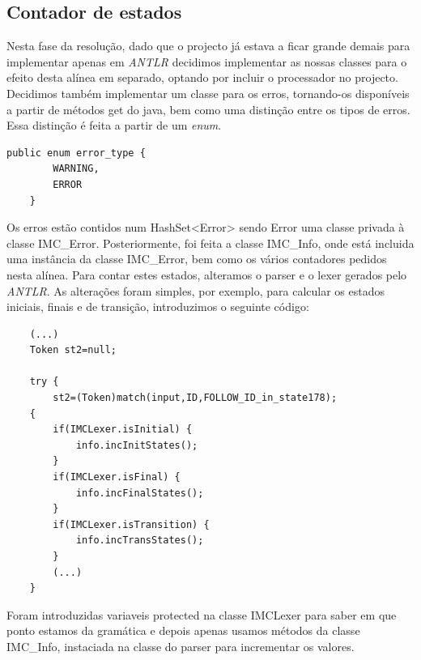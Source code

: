 \documentclass[a4paper,11pt,openright,openbib]{article}
\begin{document}
\subsection{Contador de estados} %
\label{sub:contador_de_estados}
Nesta fase da resolução, dado que o projecto já estava a ficar grande demais para implementar apenas em \emph{ANTLR} decidimos implementar as nossas classes para o efeito desta alínea em separado, optando por incluir o processador no projecto. Decidimos também implementar um classe para os erros, tornando-os disponíveis a partir de métodos get do java, bem como uma distinção entre os tipos de erros. \\
Essa distinção é feita a partir de um \emph{enum}.
\small
\begin{verbatim}
public enum error_type {
        WARNING,
        ERROR
    }	
\end{verbatim}
\normalsize
Os erros estão contidos num HashSet<Error> sendo Error uma classe privada à classe IMC\_Error. Posteriormente, foi feita a classe IMC\_Info, onde está incluida uma instância da classe IMC\_Error, bem como os vários contadores pedidos nesta alínea.
Para contar estes estados, alteramos o parser e o lexer gerados pelo \emph{ANTLR}. As alterações foram simples, por exemplo, para calcular os estados iniciais, finais e de transição, introduzimos o seguinte código:
\small
\begin{verbatim}
    (...)
    Token st2=null;		

    try {						
        st2=(Token)match(input,ID,FOLLOW_ID_in_state178);
    {
        if(IMCLexer.isInitial) {
	        info.incInitStates();				
        }
        if(IMCLexer.isFinal) {		
            info.incFinalStates();				
        }
        if(IMCLexer.isTransition) {				
	        info.incTransStates();				
        }
        (...)
    }			
\end{verbatim}
\normalsize
Foram introduzidas variaveis protected na classe IMCLexer para saber em que ponto estamos da gramática e depois apenas usamos métodos da classe IMC\_Info, instaciada na classe do parser para incrementar os valores.
\end{document}
